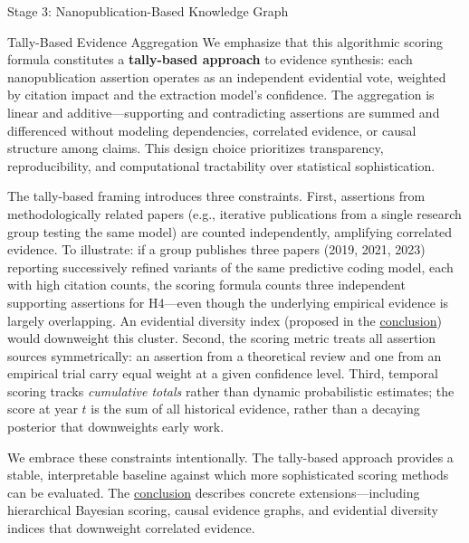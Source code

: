 \documentclass[
  ignorenonframetext,
]{beamer}
\begin{document}
\begin{frame}{Stage 3: Nanopublication-Based
Knowledge Graph \label{sec:methods_kg}}
\begin{block}{Tally-Based Evidence Aggregation}
\protect{}\label{tally-based-evidence-aggregation}
We emphasize that this algorithmic scoring formula constitutes a
\textbf{tally-based approach} to evidence synthesis: each
nanopublication assertion operates as an independent evidential vote,
weighted by citation impact and the extraction model's confidence. The
aggregation is linear and additive---supporting and contradicting
assertions are summed and differenced without modeling dependencies,
correlated evidence, or causal structure among claims. This design
choice prioritizes transparency, reproducibility, and computational
tractability over statistical sophistication.

The tally-based framing introduces three constraints. First, assertions
from methodologically related papers (e.g., iterative publications from
a single research group testing the same model) are counted
independently, amplifying correlated evidence. To illustrate: if a group
publishes three papers (2019, 2021, 2023) reporting successively refined
variants of the same predictive coding model, each with high citation
counts, the scoring formula counts three independent supporting
assertions for H4---even though the underlying empirical evidence is
largely overlapping. An evidential diversity index (proposed in the
\hyperref[sec:conclusion]{conclusion}) would downweight this cluster.
Second, the scoring metric treats all assertion sources symmetrically:
an assertion from a theoretical review and one from an empirical trial
carry equal weight at a given confidence level. Third, temporal scoring
tracks \emph{cumulative totals} rather than dynamic probabilistic
estimates; the score at year \(t\) is the sum of all historical
evidence, rather than a decaying posterior that downweights early work.

We embrace these constraints intentionally. The tally-based approach
provides a stable, interpretable baseline against which more
sophisticated scoring methods can be evaluated. The
\hyperref[sec:conclusion]{conclusion} describes concrete
extensions---including hierarchical Bayesian scoring, causal evidence
graphs, and evidential diversity indices that downweight correlated
evidence.
\end{block}
\end{frame}
\end{document}
